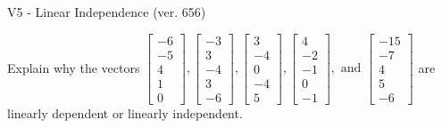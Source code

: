 \begin{exercise}
  \begin{exerciseTitle}V5 - Linear Independence (ver. 656)\end{exerciseTitle}
  \begin{exerciseStatement}
    Explain why the vectors \(\left[\begin{array}{r}
-6 \\
-5 \\
4 \\
1 \\
0
\end{array}\right] , \left[\begin{array}{r}
-3 \\
3 \\
-4 \\
3 \\
-6
\end{array}\right] , \left[\begin{array}{r}
3 \\
-4 \\
0 \\
-4 \\
5
\end{array}\right] , \left[\begin{array}{r}
4 \\
-2 \\
-1 \\
0 \\
-1
\end{array}\right] , \text{ and } \left[\begin{array}{r}
-15 \\
-7 \\
4 \\
5 \\
-6
\end{array}\right]\) are linearly dependent or linearly independent.	



\end{exerciseStatement}
\end{exercise}
